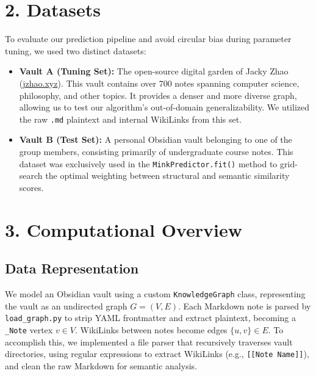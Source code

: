 \documentclass[fontsize=11pt]{article}
\begin{document}
\section*{2. Datasets}

To evaluate our prediction pipeline and avoid circular bias during parameter tuning, we used two distinct datasets:
\begin{itemize}
    \item \textbf{Vault A (Tuning Set):} The open-source digital garden of Jacky Zhao (\url{jzhao.xyz}). This vault contains over 700 notes spanning computer science, philosophy, and other topics. It provides a denser and more diverse graph, allowing us to test our algorithm's out-of-domain generalizability. We utilized the raw \texttt{.md} plaintext and internal WikiLinks from this set.
    \item \textbf{Vault B (Test Set):} A personal Obsidian vault belonging to one of the group members, consisting primarily of undergraduate course notes. This dataset was exclusively used in the \texttt{MinkPredictor.fit()} method to grid-search the optimal weighting between structural and semantic similarity scores.
\end{itemize}

\section*{3. Computational Overview}

\subsection*{Data Representation}
We model an Obsidian vault using a custom \texttt{KnowledgeGraph} class, representing the vault as an undirected graph $G = (V, E)$. Each Markdown note is parsed by \texttt{load\_graph.py} to strip YAML frontmatter and extract plaintext, becoming a \texttt{\_Note} vertex $v \in V$. WikiLinks between notes become edges $\{u, v\} \in E$. To accomplish this, we implemented a file parser that recursively traverses vault directories, using regular expressions to extract WikiLinks (e.g., \texttt{[[Note Name]]}), and clean the raw Markdown for semantic analysis.
\end{document}
